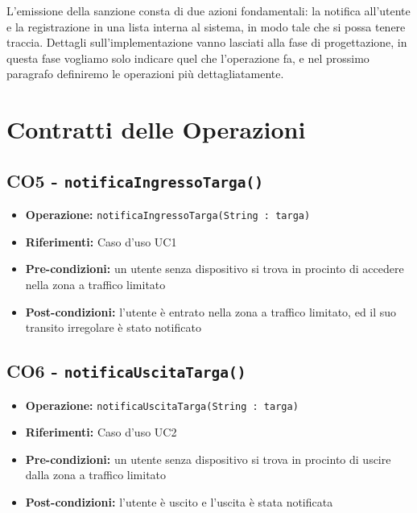 \documentclass[12pt, letterpaper]{article}
\begin{document}
\noindent
L'emissione della sanzione consta di due 
azioni fondamentali: la notifica all'utente
e la registrazione in una lista interna al 
sistema, in modo tale che si possa tenere 
traccia. Dettagli sull'implementazione vanno 
lasciati alla fase di progettazione, in questa 
fase vogliamo solo indicare quel che l'operazione 
fa, e nel prossimo paragrafo definiremo le 
operazioni più dettagliatamente.

\section{Contratti delle Operazioni}

\subsection{CO5 - \texttt{notificaIngressoTarga()}}
\begin{itemize}
    \item \textbf{Operazione:} 
    \texttt{notificaIngressoTarga(String : targa)}
    \item \textbf{Riferimenti:} Caso d'uso UC1
    \item \textbf{Pre-condizioni:} un utente senza 
    dispositivo si trova in procinto di accedere 
    nella zona a traffico limitato
    \item \textbf{Post-condizioni:} l'utente 
    è entrato nella zona a traffico limitato, 
    ed il suo transito irregolare è stato 
    notificato
\end{itemize}

\subsection{CO6 - \texttt{notificaUscitaTarga()}}
\begin{itemize}
    \item \textbf{Operazione:} 
    \texttt{notificaUscitaTarga(String : targa)}
    \item \textbf{Riferimenti:} Caso d'uso UC2
    \item \textbf{Pre-condizioni:} un utente senza 
    dispositivo si trova in procinto di uscire 
    dalla zona a traffico limitato
    \item \textbf{Post-condizioni:} l'utente 
    è uscito e l'uscita è stata notificata
\end{itemize}
\end{document}
